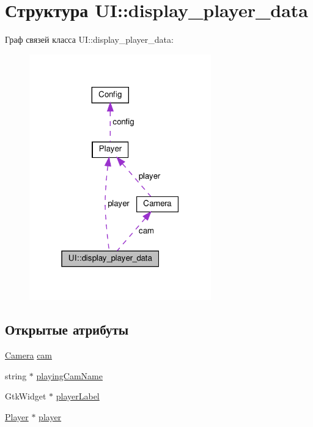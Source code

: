\hypertarget{struct_u_i_1_1display__player__data}{}\section{Структура UI\+:\+:display\+\_\+player\+\_\+data}
\label{struct_u_i_1_1display__player__data}


Граф связей класса UI\+:\+:display\+\_\+player\+\_\+data\+:\nopagebreak
\begin{figure}[H]
\begin{center}
\leavevmode
\includegraphics[width=223pt]{struct_u_i_1_1display__player__data__coll__graph}
\end{center}
\end{figure}
\subsection*{Открытые атрибуты}
\begin{DoxyCompactItemize}
\item 
\hyperlink{struct_camera}{Camera} \hyperlink{struct_u_i_1_1display__player__data_aaf6faafe9187df11c613189bb62cfe7d}{cam}
\item 
string $\ast$ \hyperlink{struct_u_i_1_1display__player__data_afc4f178e4761d152f91822cd5a070669}{playing\+Cam\+Name}
\item 
Gtk\+Widget $\ast$ \hyperlink{struct_u_i_1_1display__player__data_af5f6fe2e056926b9b804cdaeaaecc463}{player\+Label}
\item 
\hyperlink{class_player}{Player} $\ast$ \hyperlink{struct_u_i_1_1display__player__data_a05ff8238e08b44593287a350c98a80ba}{player}
\end{DoxyCompactItemize}


